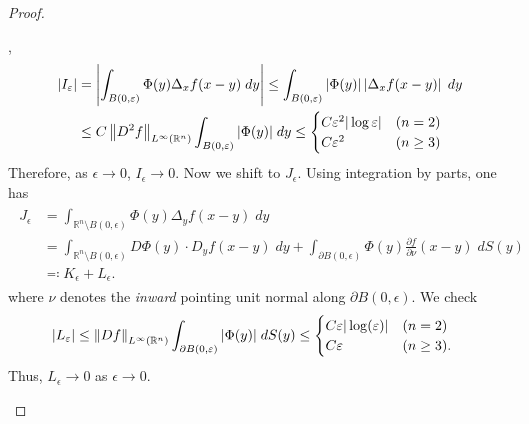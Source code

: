 \documentclass{article}
\begin{document}
\begin{itemize}
\begin{proof}
\begin{enumerate}[itemsep=-2pt,label = (\arabic{*})]
{				}, 
				\begin{align*}
					\begin{split}
						|I_{\varepsilon}| &= \left| \int_{B(0,\varepsilon)}\Phi(y)\Delta_{x}f(x-y)\;dy \right| \leq \int_{B(0,\varepsilon)}\left| \Phi(y) \right|\left| \Delta_{x}f(x-y) \right|\;dy \\
						&\leq C \left\Vert D^{2}f \right\Vert_{L^{\infty}(\mathbb{R}^{n})} \int_{B(0,\varepsilon)}|\Phi(y)|\;dy \leq 
						\begin{cases}
							C\varepsilon^{2}|\log{\varepsilon}| & (n = 2) \\
							C\varepsilon^{2} & (n\geq 3)
						\end{cases}
					\end{split}
				\end{align*}
				Therefore, as $\epsilon \to 0$, $I_{\epsilon} \to 0$. Now we shift to $J_{\epsilon}$. Using integration by parts, one has 
				\begin{align*}
					\begin{split}
						J_{\epsilon} &= \int_{\mathbb{R}^{n}\setminus B(0,\epsilon)} \Phi(y)\Delta_{y}f(x-y)\;dy \\
						&= \int_{\mathbb{R}^{n}\setminus B(0,\epsilon)}D\Phi(y) \cdot D_{y}f(x-y)\;dy + \int_{\partial B(0,\epsilon)} \Phi(y)\frac{\partial f}{\partial \nu}(x-y)\;dS(y) \\
						&\eqqcolon K_{\epsilon} + L_{\epsilon}. 
					\end{split}
				\end{align*}
				where $\nu$ denotes the \textit{inward} pointing unit normal along $\partial B(0,\epsilon)$. We check
				\begin{align*}
					\begin{split}
						|L_{\varepsilon}| &\leq \left\Vert Df \right\Vert_{L^{\infty}(\mathbb{R}^{n})}\int_{\partial B(0,\varepsilon)}|\Phi(y)|\;dS(y) \leq 
						\begin{cases}
							C\varepsilon|\log(\varepsilon)| & (n=2) \\
							C\varepsilon & (n \geq 3). 
						\end{cases}
					\end{split}
				\end{align*}
				Thus, $L_{\epsilon} \to 0$ as $\epsilon \to 0$. 
				

\end{enumerate}
\end{proof}
\end{itemize}
\end{document}
